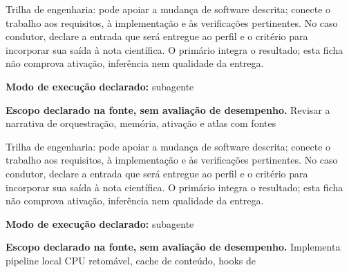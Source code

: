 \begin{funcao}
Trilha de engenharia: pode apoiar a mudança de software descrita; conecte o trabalho aos requisitos, à implementação e às verificações pertinentes. No caso condutor, declare a entrada que será entregue ao perfil e o critério para incorporar sua saída à nota científica. O primário integra o resultado; esta ficha não comprova ativação, inferência nem qualidade da entrega.
\end{funcao}

\begin{arquitetura}
\textbf{Modo de execução declarado:} subagente
\end{arquitetura}


\begin{descricao}
\textbf{Escopo declarado na fonte, sem avaliação de desempenho.}
Revisar a narrativa de orquestração, memória, ativação e atlas com fontes
\end{descricao}

\begin{funcao}
Trilha de engenharia: pode apoiar a mudança de software descrita; conecte o trabalho aos requisitos, à implementação e às verificações pertinentes. No caso condutor, declare a entrada que será entregue ao perfil e o critério para incorporar sua saída à nota científica. O primário integra o resultado; esta ficha não comprova ativação, inferência nem qualidade da entrega.
\end{funcao}

\begin{arquitetura}
\textbf{Modo de execução declarado:} subagente
\end{arquitetura}


\begin{descricao}
\textbf{Escopo declarado na fonte, sem avaliação de desempenho.}
Implementa pipeline local CPU retomável, cache de conteúdo, hooks de
\end{descricao}

